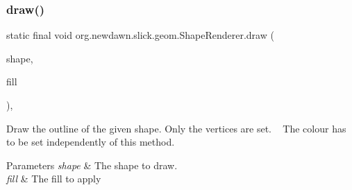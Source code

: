 \subsubsection{\texorpdfstring{draw()}{draw()}\hspace{0.1cm}{\footnotesize\ttfamily [2/2]}}
{\footnotesize\ttfamily static final void org.\+newdawn.\+slick.\+geom.\+Shape\+Renderer.\+draw (\begin{DoxyParamCaption}\item[{\mbox{\hyperlink{classorg_1_1newdawn_1_1slick_1_1geom_1_1_shape}{Shape}}}]{shape,  }\item[{\mbox{\hyperlink{interfaceorg_1_1newdawn_1_1slick_1_1_shape_fill}{Shape\+Fill}}}]{fill }\end{DoxyParamCaption})\hspace{0.3cm}{\ttfamily [inline]}, {\ttfamily [static]}}

Draw the outline of the given shape. Only the vertices are set. ~\newline
The colour has to be set independently of this method.


\begin{DoxyParams}{Parameters}
{\em shape} & The shape to draw. \\
\hline
{\em fill} & The fill to apply \\
\hline
\end{DoxyParams}

